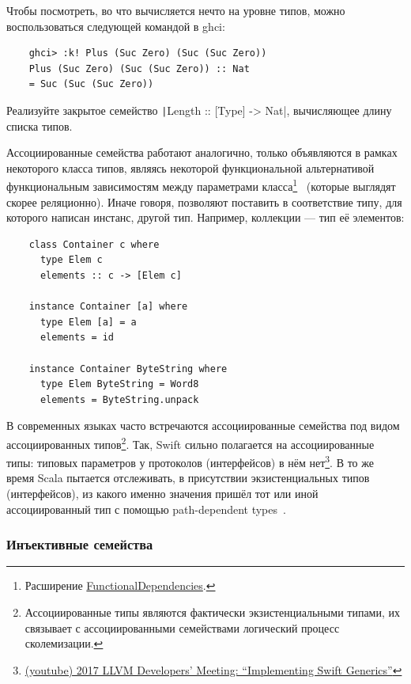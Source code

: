 Чтобы посмотреть, во что вычисляется нечто на уровне типов, можно воспользоваться следующей командой в ghci:
\begin{verbatim}
    ghci> :k! Plus (Suc Zero) (Suc (Suc Zero))
    Plus (Suc Zero) (Suc (Suc Zero)) :: Nat
    = Suc (Suc (Suc Zero))
\end{verbatim}

\begin{task}
    Реализуйте закрытое семейство \texttt|Length :: [Type] -> Nat|, вычисляющее длину списка типов.
\end{task}

Ассоциированные семейства работают аналогично, только объявляются в рамках некоторого класса типов, являясь некоторой функциональной альтернативой функциональным зависимостям между параметрами класса\footnote{Расширение \href{https://ghc.gitlab.haskell.org/ghc/doc/users_guide/exts/functional_dependencies.html}{FunctionalDependencies}.}~\cite{jones2000type} (которые выглядят скорее реляционно).
Иначе говоря, позволяют поставить в соответствие типу, для которого написан инстанс, другой тип.
Например, коллекции --- тип её элементов:

\begin{verbatim}
    class Container c where
      type Elem c
      elements :: c -> [Elem c]

    instance Container [a] where
      type Elem [a] = a
      elements = id

    instance Container ByteString where
      type Elem ByteString = Word8
      elements = ByteString.unpack
\end{verbatim}

В современных языках часто встречаются ассоциированные семейства под видом ассоциированных типов\footnote{Ассоциированные типы являются фактически экзистенциальными типами, их связывает с ассоциированными семействами логический процесс сколемизации.}.
Так, Swift сильно полагается на ассоциированные типы: типовых параметров у протоколов (интерфейсов) в нём нет\footnote{\href{https://youtu.be/ctS8FzqcRug?si=y_ZYnuUOulA33d_X}{(youtube) 2017 LLVM Developers’ Meeting: ``Implementing Swift Generics''}}.
В то же время Scala пытается отслеживать, в присутствии экзистенциальных типов (интерфейсов), из какого именно значения пришёл тот или иной ассоциированный тип с помощью path-dependent types~\cite{amin2014foundations}.

\subsubsection{Инъективные семейства}

